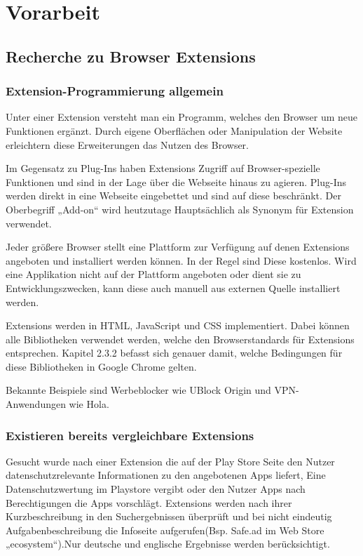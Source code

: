 \chapter{Vorarbeit}
\label{c:vorarbeit}


\section{Recherche zu Browser Extensions}
\label{s:recherchebrowserextensions}

\subsection{Extension-Programmierung allgemein}
\label{ss:extensionprogallg}

Unter einer Extension versteht man ein Programm, welches den Browser um neue Funktionen ergänzt. Durch eigene Oberflächen oder Manipulation der Website erleichtern diese Erweiterungen das Nutzen des Browser.

Im Gegensatz zu Plug-Ins haben Extensions Zugriff auf Browser-spezielle Funktionen und sind in der Lage über die Webseite hinaus zu agieren. Plug-Ins werden direkt in eine Webseite eingebettet und sind auf diese beschränkt. Der Oberbegriff „Add-on“ wird heutzutage Hauptsächlich als Synonym für Extension verwendet.

Jeder größere Browser stellt eine Plattform zur Verfügung auf denen Extensions angeboten und installiert werden können. In der Regel sind Diese kostenlos. Wird eine Applikation nicht auf der Plattform angeboten oder dient sie zu Entwicklungszwecken, kann diese auch manuell aus externen Quelle installiert werden.

Extensions werden in HTML, JavaScript und CSS implementiert. Dabei können alle Bibliotheken verwendet werden, welche den Browserstandards für Extensions entsprechen. Kapitel 2.3.2 befasst sich genauer damit, welche Bedingungen für diese Bibliotheken in Google Chrome gelten.

Bekannte Beispiele sind Werbeblocker wie UBlock Origin und VPN-Anwendungen wie Hola.

\subsection{Existieren bereits vergleichbare Extensions}
\label{ss:vergleichbareextensions}

Gesucht wurde nach einer Extension die auf der Play Store Seite den Nutzer datenschutzrelevante Informationen zu den angebotenen Apps liefert, Eine Datenschutzwertung im Playstore vergibt oder den Nutzer Apps nach Berechtigungen die Apps vorschlägt.
Extensions werden nach ihrer Kurzbeschreibung in den Suchergebnissen überprüft und bei nicht eindeutig Aufgabenbeschreibung die Infoseite aufgerufen(Bsp. Safe.ad im Web Store „ecosystem“).Nur deutsche und englische  Ergebnisse werden berücksichtigt.

